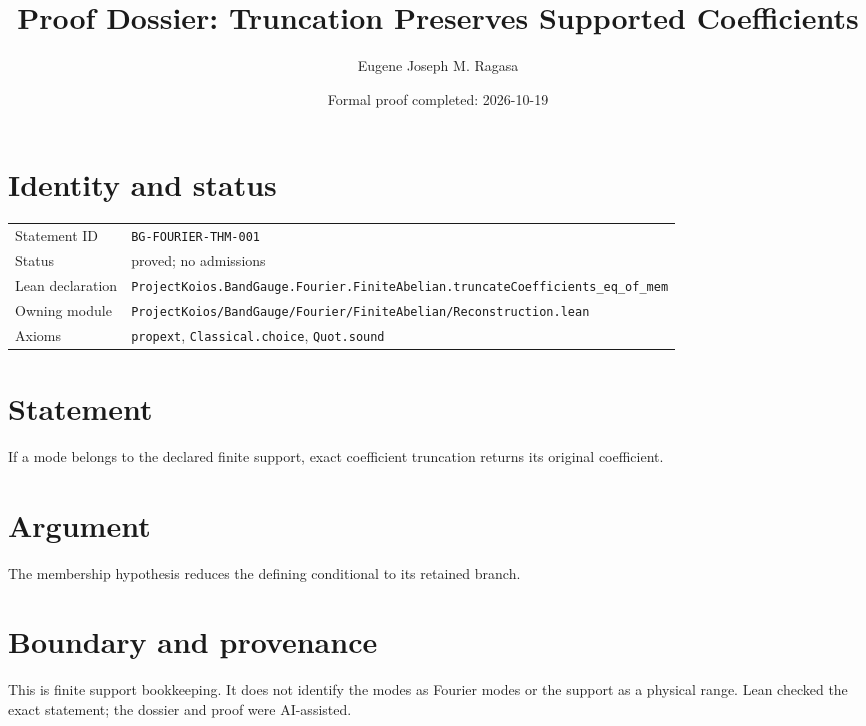 \documentclass[11pt]{article}
\title{Proof Dossier: Truncation Preserves Supported Coefficients}
\author{Eugene Joseph M. Ragasa}
\date{Formal proof completed: 2026-10-19}
\begin{document}
\maketitle
\section{Identity and status}
\begin{tabularx}{\textwidth}{@{}lX@{}}\toprule
Statement ID & \texttt{BG-FOURIER-THM-001} \\
Status & proved; no admissions \\
Lean declaration & \texttt{ProjectKoios.BandGauge.Fourier.FiniteAbelian.truncateCoefficients\_eq\_of\_mem} \\
Owning module & \texttt{ProjectKoios/BandGauge/Fourier/FiniteAbelian/Reconstruction.lean} \\
Axioms & \texttt{propext}, \texttt{Classical.choice}, \texttt{Quot.sound} \\
\bottomrule\end{tabularx}
\section{Statement}
If a mode belongs to the declared finite support, exact coefficient truncation returns its original coefficient.
\section{Argument}
The membership hypothesis reduces the defining conditional to its retained branch.
\section{Boundary and provenance}
This is finite support bookkeeping. It does not identify the modes as Fourier modes or the support as a physical range. Lean checked the exact statement; the dossier and proof were AI-assisted.
\end{document}
